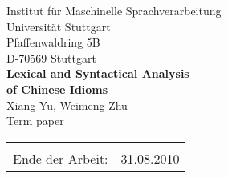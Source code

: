 \documentclass[12pt,leqno,a4paper]{article}
\newcommand{\Titel}{Lexical and Syntactical Analysis \\of Chinese Idioms}
\begin{document}
\begin{titlepage}
  \large
  \begin{center}
    Institut f\"ur Maschinelle Sprachverarbeitung\\
    Universit\"at Stuttgart\\
    Pfaffenwaldring 5B\\
    D-70569 Stuttgart\\    
      \vfill
    {\LARGE \bf \Titel} \\
    \vspace{2cm}
    Xiang Yu, Weimeng Zhu\\
    Term paper 
      \vfill
    \begin{tabular}[t]{lr}
    \\
    \\
    {Ende der Arbeit:} & 31.08.2010\\
    \end{tabular}
  \end{center}

  \normalsize
\end{titlepage}

\newpage
\thispagestyle{empty}










\tableofcontents
\newpage



















\end{document}
